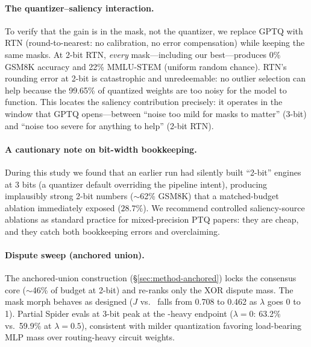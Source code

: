 \paragraph{The quantizer--saliency interaction.}
To verify that the gain is in the mask, not the quantizer, we replace GPTQ with
RTN (round-to-nearest: no calibration, no error compensation) while keeping the
same masks. At 2-bit RTN, \emph{every} mask---including our best---produces
0\% GSM8K accuracy and 22\% MMLU-STEM (uniform random chance). RTN's rounding
error at 2-bit is catastrophic and unredeemable: no outlier selection can help
because the 99.65\% of quantized weights are too noisy for the model to
function. This locates the saliency contribution precisely: it operates in the
window that GPTQ opens---between ``noise too mild for masks to matter'' (3-bit)
and ``noise too severe for anything to help'' (2-bit RTN).

\paragraph{A cautionary note on bit-width bookkeeping.}
During this study we found that an earlier run had silently built ``2-bit''
\method{} engines at 3 bits (a quantizer default overriding the pipeline
intent), producing implausibly strong 2-bit numbers ($\sim$62\% GSM8K) that a
matched-budget ablation immediately exposed ($28.7\%$). We recommend
controlled saliency-source ablations as standard practice for mixed-precision
PTQ papers: they are cheap, and they catch both bookkeeping errors and
overclaiming.

\paragraph{Dispute sweep (anchored union).}
The anchored-union construction (\S\ref{sec:method-anchored}) locks the
consensus core ($\sim$46\% of budget at 2-bit) and re-ranks only the XOR
dispute mass. The mask morph behaves as designed ($J$ vs.\ \baseline{} falls
from 0.708 to 0.462 as $\lambda$ goes 0 to 1). Partial Spider evals at 3-bit
peak at the \baseline{}-heavy endpoint ($\lambda{=}0$: 63.2\% vs.\ 59.9\% at
$\lambda{=}0.5$), consistent with milder quantization favoring load-bearing
MLP mass over routing-heavy circuit weights. 
